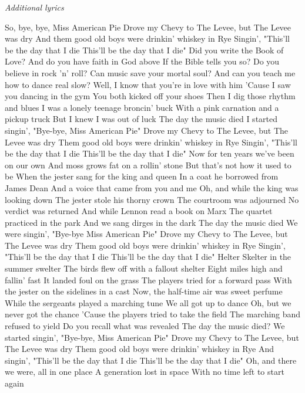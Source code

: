 \documentclass[../../songbookMain]{subfiles}
\begin{document}
\begin{guitar}
\begin{center}
\textit{Additional lyrics}
\end{center}
\tiny\flushleft
\begin{multicols}{2}
So, bye, bye, Miss American Pie
Drove my Chevy to The Levee, but The Levee was dry
And them good old boys were drinkin' whiskey in Rye
Singin', "This'll be the day that I die
This'll be the day that I die"
Did you write the Book of Love?
And do you have faith in God above
If the Bible tells you so?
Do you believe in rock 'n' roll?
Can music save your mortal soul?
And can you teach me how to dance real slow?
Well, I know that you're in love with him
'Cause I saw you dancing in the gym
You both kicked off your shoes
Then I dig those rhythm and blues
I was a lonely teenage broncin' buck
With a pink carnation and a pickup truck
But I knew I was out of luck
The day the music died
I started singin', "Bye-bye, Miss American Pie"
Drove my Chevy to The Levee, but The Levee was dry
Them good old boys were drinkin' whiskey in Rye
Singin', "This'll be the day that I die
This'll be the day that I die"
Now for ten years we've been on our own
And moss grows fat on a rollin' stone
But that's not how it used to be
When the jester sang for the king and queen
In a coat he borrowed from James Dean
And a voice that came from you and me
Oh, and while the king was looking down
The jester stole his thorny crown
The courtroom was adjourned
No verdict was returned
And while Lennon read a book on Marx
The quartet practiced in the park
And we sang dirges in the dark
The day the music died
We were singin', "Bye-bye Miss American Pie"
Drove my Chevy to The Levee, but The Levee was dry
Them good old boys were drinkin' whiskey in Rye
Singin', "This'll be the day that I die
This'll be the day that I die"
Helter Skelter in the summer swelter
The birds flew off with a fallout shelter
Eight miles high and fallin' fast
It landed foul on the grass
The players tried for a forward pass
With the jester on the sidelines in a cast
Now, the half-time air was sweet perfume
While the sergeants played a marching tune
We all got up to dance
Oh, but we never got the chance
'Cause the players tried to take the field
The marching band refused to yield
Do you recall what was revealed
The day the music died?
We started singin', "Bye-bye, Miss American Pie"
Drove my Chevy to The Levee, but The Levee was dry
Them good old boys were drinkin' whiskey in Rye
And singin', "This'll be the day that I die
This'll be the day that I die"
Oh, and there we were, all in one place
A generation lost in space
With no time left to start again

\end{multicols}
\end{guitar}
\end{document}
